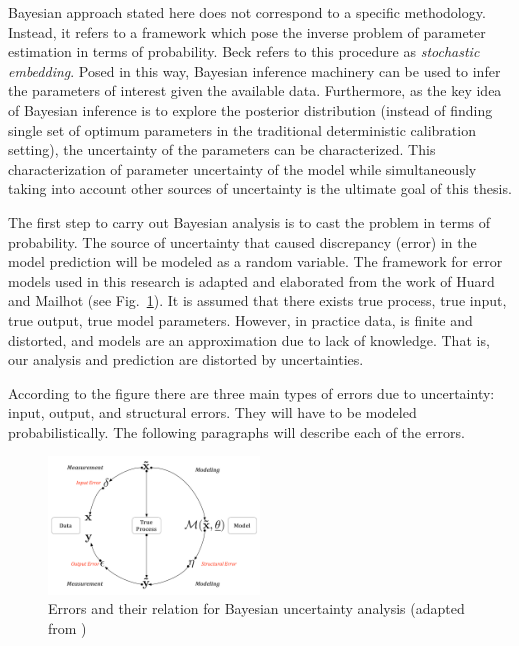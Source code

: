 \documentclass[11pt,titlepage]{article}
\begin{document}
Bayesian approach stated here does not correspond to a specific methodology. 
Instead, it refers to a framework which pose the inverse problem of parameter estimation in terms of probability. 
Beck \cite{Beck2010} refers to this procedure as \emph{stochastic embedding}. 
Posed in this way, Bayesian inference machinery can be used to infer the parameters of interest given the available data. 
Furthermore, as the key idea of Bayesian inference is to explore the posterior distribution (instead of finding single set of optimum parameters in the traditional deterministic calibration setting), the uncertainty of the parameters can be characterized. 
This characterization of parameter uncertainty of the model while simultaneously taking into account other sources of uncertainty is the ultimate goal of this thesis. 

The first step to carry out Bayesian analysis is to cast the problem in terms of probability. 
The source of uncertainty that caused discrepancy (error) in the model prediction will be modeled as a random variable. 
The framework for error models used in this research is adapted and elaborated from the work of Huard and Mailhot \cite{HuardMailhot2006} (see Fig.~\ref{fig:HuardMailhot}). 
It is assumed that there exists true process, true input, true output, true model parameters. 
However, in practice data, is finite and distorted, and models are an approximation due to lack of knowledge. 
That is, our analysis and prediction are distorted by uncertainties. 

According to the figure there are three main types of errors due to uncertainty: input, output, and structural errors. 
They will have to be modeled probabilistically.
The following paragraphs will describe each of the errors.
\begin{figure}[htbp]
	\centering
	\includegraphics[width=0.50\textwidth]{HuardMailhot.pdf}
	\caption{Errors and their relation for Bayesian uncertainty analysis (adapted from \cite{HuardMailhot2006})}
	\label{fig:HuardMailhot}
\end{figure}
\end{document}
